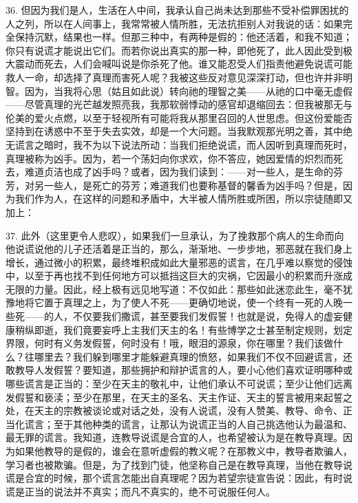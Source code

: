 36. 但因为我们是人，生活在人中间，我承认自己尚未达到那些不受补偿罪困扰的人之列，所以在人间事上，我常常被人情所胜，无法抗拒别人对我说的话：如果完全保持沉默，结果也一样。但那三种中，有两种是假的：他还活着，和我不知道；你只有说谎才能说出它们。而若你说出真实的那一种，即他死了，此人因此受到极大震动而死去，人们会喊叫说是你杀死了他。谁又能忍受人们指责他避免说谎可能救人一命，却选择了真理而害死人呢？我被这些反对意见深深打动，但也许并非明智。因为，当我将心思（姑且如此说）转向祂的理智之美——从祂的口中毫无虚假——尽管真理的光芒越发照亮我，我那软弱悸动的感官却退缩回去：但我被那无与伦美的爱火点燃，以至于轻视所有可能将我从那里召回的人世思虑。但这份爱能否坚持到在诱惑中不至于失去实效，却是一个大问题。当我默观那光明之善，其中绝无谎言之暗时，我不为以下说法所动：当我们拒绝说谎，而人因听到真理而死时，真理被称为凶手。因为，若一个荡妇向你求欢，你不答应，她因爱情的炽烈而死去，难道贞洁也成了凶手吗？或者，因为我们读到：——对一些人，是生命的芬芳，对另一些人，是死亡的芬芳；难道我们也要称基督的馨香为凶手吗？但是，因为我们作为人，在这样的问题和矛盾中，大半被人情所胜或所困，所以宗徒随即又加上：\par

37. 此外（这里更令人悲叹），如果我们一旦承认，为了挽救那个病人的生命而向他说谎说他的儿子还活着是正当的，那么，渐渐地、一步步地，邪恶就在我们身上增长，通过微小的积累，最终堆积成如此大量邪恶的谎言，在几乎难以察觉的侵蚀中，以至于再也找不到任何地方可以抵挡这巨大的灾祸，它因最小的积累而升涨成无限的力量。因此，经上极有远见地写道：不仅如此：那些如此迷恋此生，毫不犹豫地将它置于真理之上，为了使人不死——更确切地说，使一个终有一死的人晚一些死——的人，不仅要我们撒谎，甚至要我们发假誓！也就是说，免得人的虚妄健康稍纵即逝，我们竟要妄呼上主我们天主的名！有些博学之士甚至制定规则，划定界限，何时有义务发假誓，何时没有！哦，眼泪的源泉，你在哪里？我们该做什么？往哪里去？我们躲到哪里才能躲避真理的愤怒，如果我们不仅不回避谎言，还敢教导人发假誓？要知道，那些拥护和辩护谎言的人，要小心他们喜欢证明哪种或哪些谎言是正当的：至少在天主的敬礼中，让他们承认不可说谎；至少让他们远离发假誓和亵渎；至少在那里，在天主的圣名、天主作证、天主的誓言被用来起誓之处，在天主的宗教被谈论或对话之处，没有人说谎，没有人赞美、教导、命令、正当化谎言；至于其他种类的谎言，让那认为说谎正当的人自己挑选他认为最温和、最无罪的谎言。我知道，连教导说谎是合宜的人，也希望被认为是在教导真理。因为如果他教导的是假的，谁会在意听虚假的教义呢？在那教义中，教导者欺骗人，学习者也被欺骗。但是，为了找到门徒，他坚称自己是在教导真理，当他在教导说谎是合宜的时候，那个谎言怎能出自真理呢？因为若望宗徒宣告说：因此，有时说谎是正当的说法并不真实；而凡不真实的，绝不可说服任何人。\par

